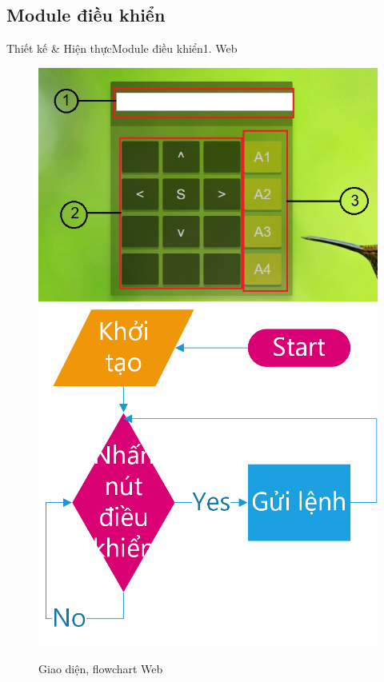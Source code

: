 \documentclass[compress, blue, 13pt,hyperref={pdfpagemode=FullScreen}]{beamer}
\begin{document}
\subsection{Module điều khiển}
\begin{frame}{Thiết kế \& Hiện thực}{Module điều khiển}{1. Web}
\begin{figure}[hbtp]
\centering
\includegraphics[scale=0.25]{images/web_layout.PNG}
\includegraphics[scale=0.6]{images/flowchart_web.png}
\caption{Giao diện, flowchart  Web}
\end{figure}
\end{frame}
\end{document}
